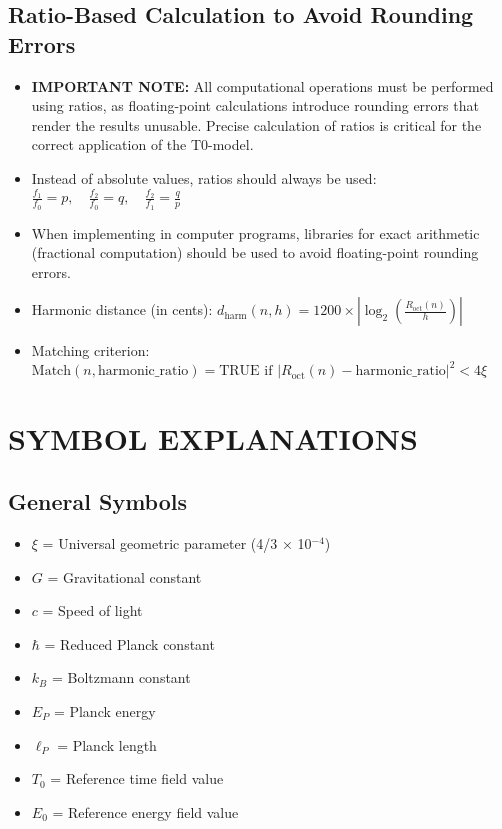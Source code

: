 \documentclass[12pt,a4paper]{article}
\begin{document}
	\subsection{Ratio-Based Calculation to Avoid Rounding Errors}
	\begin{itemize}
		\item \textbf{IMPORTANT NOTE:} All computational operations must be performed using ratios, as floating-point calculations introduce rounding errors that render the results unusable. Precise calculation of ratios is critical for the correct application of the T0-model.
		
		\item Instead of absolute values, ratios should always be used:
		$\frac{f_1}{f_0} = p, \quad \frac{f_2}{f_0} = q, \quad \frac{f_2}{f_1} = \frac{q}{p}$
		
		\item When implementing in computer programs, libraries for exact arithmetic (fractional computation) should be used to avoid floating-point rounding errors.
		
		\item Harmonic distance (in cents):
		$d_{\text{harm}}(n,h) = 1200 \times \left|\log_2\left(\frac{R_{\text{oct}}(n)}{h}\right)\right|$
		
		\item Matching criterion:
		$\text{Match}(n, \text{harmonic\_ratio}) = \text{TRUE if } |R_{\text{oct}}(n) - \text{harmonic\_ratio}|^2 < 4\xi$
	\end{itemize}
	
	\section{SYMBOL EXPLANATIONS}
	
	\subsection{General Symbols}
	\begin{itemize}
		\item $\xi$ = Universal geometric parameter (4/3 × 10$^{-4}$)
		\item $G$ = Gravitational constant
		\item $c$ = Speed of light
		\item $\hbar$ = Reduced Planck constant
		\item $k_B$ = Boltzmann constant
		\item $E_P$ = Planck energy
		\item $\ell_P$ = Planck length
		\item $T_0$ = Reference time field value
		\item $E_0$ = Reference energy field value
	\end{itemize}
	
\end{document}
